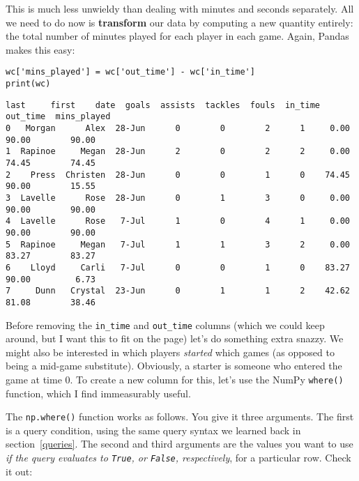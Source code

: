 
This is much less unwieldy than dealing with minutes and seconds separately.
All we need to do now is \textbf{transform} our data by computing a new
quantity entirely: the {total number of minutes played} for each player in each
game. Again, Pandas makes this easy:

\begin{Verbatim}[fontsize=\small,samepage=true,frame=single,framesep=3mm]
wc['mins_played'] = wc['out_time'] - wc['in_time']
print(wc)
\end{Verbatim}
\vspace{-.2in}

\begin{Verbatim}[fontsize=\scriptsize,samepage=true,frame=leftline,framesep=5mm,framerule=1mm]
      last     first    date  goals  assists  tackles  fouls  in_time  out_time  mins_played
0   Morgan      Alex  28-Jun      0        0        2      1     0.00     90.00        90.00
1  Rapinoe     Megan  28-Jun      2        0        2      2     0.00     74.45        74.45
2    Press  Christen  28-Jun      0        0        1      0    74.45     90.00        15.55
3  Lavelle      Rose  28-Jun      0        1        3      0     0.00     90.00        90.00
4  Lavelle      Rose   7-Jul      1        0        4      1     0.00     90.00        90.00
5  Rapinoe     Megan   7-Jul      1        1        3      2     0.00     83.27        83.27
6    Lloyd     Carli   7-Jul      0        0        1      0    83.27     90.00         6.73
7     Dunn   Crystal  23-Jun      0        1        1      2    42.62     81.08        38.46
\end{Verbatim}


Before removing the \texttt{in\_time} and \texttt{out\_time} columns (which we
could keep around, but I want this to fit on the page) let's do something extra
snazzy. We might also be interested in which players \textit{started} which
games (as opposed to being a mid-game substitute). Obviously, a starter is
someone who entered the game at time 0. To create a new column for this, let's
use the NumPy \texttt{where()} function, which I find immeasurably useful.

The \texttt{np.where()} function works as follows. You give it three arguments.
The first is a query condition, using the same query syntax we learned back in
section~\ref{queries}. The second and third arguments are the values you want
to use \textit{if the query evaluates to \texttt{True}, or \texttt{False},
respectively}, for a particular row. Check it out:

